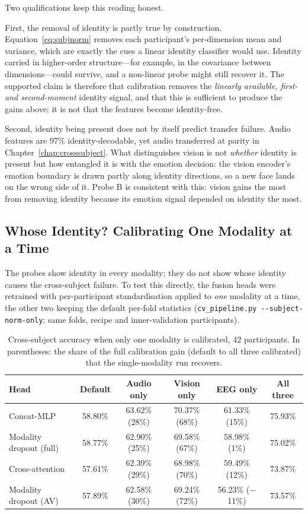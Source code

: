 Two qualifications keep this reading honest.

First, the removal of identity is partly true by construction. Equation~\ref{eq:subjnorm}
removes each participant's per-dimension mean and variance, which are exactly the
cues a linear identity classifier would use. Identity carried in higher-order
structure---for example, in the covariance between dimensions---could survive, and a
non-linear probe might still recover it. The supported claim is therefore that
calibration removes the \emph{linearly available, first- and second-moment} identity
signal, and that this is sufficient to produce the gains above; it is not that the
features become identity-free.

Second, identity being present does not by itself predict transfer failure. Audio
features are 97\% identity-decodable, yet audio transferred at parity in
Chapter~\ref{chap:crosssubject}. What distinguishes vision is not \emph{whether}
identity is present but how entangled it is with the emotion decision: the vision
encoder's emotion boundary is drawn partly along identity directions, so a new face
lands on the wrong side of it. Probe B is consistent with this: vision gains the most
from removing identity because its emotion signal depended on identity the most.

\subsection{Whose Identity? Calibrating One Modality at a Time}
\label{sec:cal_per_modality}

The probes show identity in every modality; they do not show whose identity causes the
cross-subject failure. To test this directly, the fusion heads were retrained with
per-participant standardisation applied to \emph{one} modality at a time, the other two
keeping the default per-fold statistics (\texttt{cv\_pipeline.py
-{}-subject-norm-only}; same folds, recipe and inner-validation participants).

\begin{table}[htbp]
\centering
\small
\caption{Cross-subject accuracy when only one modality is calibrated, 42 participants.
In parentheses: the share of the full calibration gain (default to all three
calibrated) that the single-modality run recovers.}
\label{tab:cal_per_modality}
\begin{tabular}{lccccc}
\hline
\textbf{Head} & \textbf{Default} & \textbf{Audio only} & \textbf{Vision only} & \textbf{EEG only} & \textbf{All three} \\
\hline
Concat-MLP              & 58.80\% & 63.62\% (28\%) & 70.37\% (68\%) & 61.33\% (15\%)  & 75.93\% \\
Modality dropout (full) & 58.77\% & 62.90\% (25\%) & 69.58\% (67\%) & 58.98\% (1\%)   & 75.02\% \\
Cross-attention         & 57.61\% & 62.39\% (29\%) & 68.98\% (70\%) & 59.49\% (12\%)  & 73.87\% \\
Modality dropout (AV)   & 57.89\% & 62.58\% (30\%) & 69.24\% (72\%) & 56.23\% ($-$11\%) & 73.57\% \\
\hline
\end{tabular}
\end{table}

